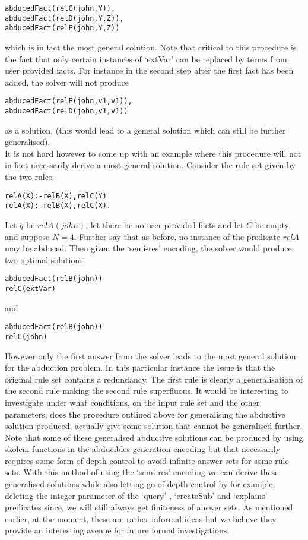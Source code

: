 \begin{lstlisting}[frame = none]
abducedFact(relC(john,Y)), 
abducedFact(relD(john,Y,Z)), 
abducedFact(relE(john,Y,Z)) 
\end{lstlisting}
which is in fact the most general solution. Note that critical to this procedure is the fact that only certain instances of ‘extVar’ can be replaced by terms from user provided facts. For instance in the second step after the first fact has been added, the solver will not produce 
\begin{lstlisting}[frame = none]
abducedFact(relE(john,v1,v1)),
abducedFact(relD(john,v1,v1))
\end{lstlisting}
as a solution, (this would lead to a general solution which can still be further generalised).\\ It is not hard however to come up with an example where this procedure will not in fact necessarily derive a most general solution. Consider the rule set given by the two rules:
\begin{lstlisting}[frame = none]
relA(X):-relB(X),relC(Y)
relA(X):-relB(X),relC(X).
\end{lstlisting}
Let $q$ be $relA(john)$, let there be no user provided facts and let $C$ be empty and suppose $N = 4$. Further say that as before, no instance of the predicate $relA$ may be abduced. Then given the ‘semi-res’ encoding, the solver would produce two optimal solutions:
\begin{lstlisting}[frame = none]
abducedFact(relB(john))
relC(extVar)
\end{lstlisting} and 
\begin{lstlisting}[frame = none]
abducedFact(relB(john))
relC(john)
\end{lstlisting}
However only the first answer from the solver leads to the most general solution for the abduction problem. In this particular instance the issue is that the original rule set contains a redundancy. The first rule is clearly a generalisation of the second rule making the second rule superfluous. It would be interesting to investigate under what conditions, on the input rule set and the other parameters, does the procedure outlined above for generalising the abductive solution produced, actually give some solution that cannot be generalised further. \\Note that some of these generalised abductive solutions can be produced by using skolem functions in the abducibles generation encoding but that necessarily requires some form of depth control to avoid infinite answer sets for some rule sets. With this method of using the ‘semi-res’ encoding we can derive these generalised solutions while also letting go of depth control by for example, deleting the integer parameter of the  ‘query’ , ‘createSub’ and ‘explains’ predicates since, we will still always get finiteness of answer sets. As mentioned earlier, at the moment, these are rather informal ideas but we believe they provide an interesting avenue for future formal investigations.    






